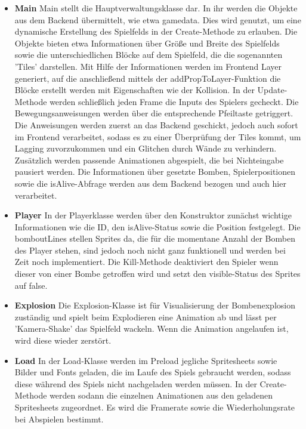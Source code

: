\documentclass[conference]{IEEEtran}
\begin{document}
\begin{itemize}
    \item \textbf{Main}
    Main stellt die Hauptverwaltungsklasse dar. In ihr werden die Objekte aus dem Backend übermittelt, wie etwa gamedata. Dies wird genutzt, um eine dynamische Erstellung des Spielfelds in der Create-Methode zu erlauben. Die Objekte bieten etwa Informationen über Größe und Breite des Spielfelds sowie die unterschiedlichen Blöcke auf dem Spielfeld, die die sogenannten 'Tiles' darstellen. Mit Hilfe der Informationen werden im Frontend Layer generiert, auf die anschließend mittels der addPropToLayer-Funktion die Blöcke erstellt werden mit Eigenschaften wie der Kollision. In der Update-Methode werden schließlich jeden Frame die Inputs des Spielers gecheckt. Die Bewegungsanweisungen werden über die entsprechende Pfeiltaste getriggert. Die Anweisungen werden zuerst an das Backend geschickt, jedoch auch sofort im Frontend verarbeitet, sodass es zu einer Überprüfung der Tiles kommt, um Lagging zuvorzukommen und ein Glitchen durch Wände zu verhindern. Zusätzlich werden passende Animationen abgespielt, die bei Nichteingabe pausiert werden. Die Informationen über gesetzte Bomben, Spielerpositionen sowie die isAlive-Abfrage werden aus dem Backend bezogen und auch hier verarbeitet.
    \smallskip
    \item \textbf{Player} 
	In der Playerklasse werden über den Konstruktor zunächst wichtige Informationen wie die ID, den isAlive-Status sowie die Position festgelegt. Die bomboutLines stellen Sprites da, die für die momentane Anzahl der Bomben des Player stehen, sind jedoch noch nicht ganz funktionell und werden bei Zeit noch implementiert. Die Kill-Methode deaktiviert den Spieler wenn dieser von einer Bombe getroffen wird und setzt den visible-Status des Sprites auf false.
    \smallskip
    \item \textbf{Explosion}
    Die Explosion-Klasse ist für Visualisierung der Bombenexplosion zuständig und spielt beim Explodieren eine Animation ab und lässt per 'Kamera-Shake' das Spielfeld wackeln. Wenn die Animation angelaufen ist, wird diese wieder zerstört.
    \smallskip
    \item \textbf{Load}
    In der Load-Klasse werden im Preload jegliche Spritesheets sowie Bilder und Fonts geladen, die im Laufe des Spiels gebraucht werden, sodass diese während des Spiels nicht nachgeladen werden müssen. In der Create-Methode werden sodann die einzelnen Animationen aus den geladenen Spritesheets zugeordnet. Es wird die Framerate sowie die Wiederholungsrate bei Abspielen bestimmt.

\end{itemize}
\end{document}
